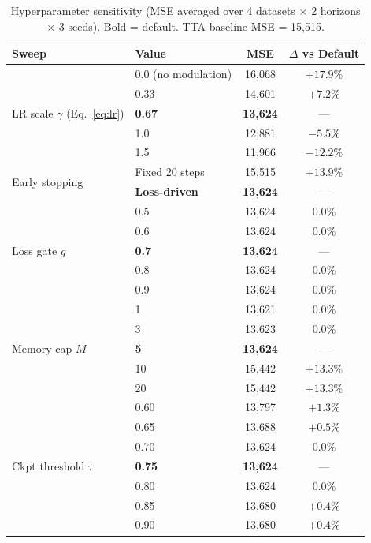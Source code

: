\documentclass[11pt,a4paper]{article}
\begin{document}
\begin{table}[t]
\centering
\caption{Hyperparameter sensitivity (MSE averaged over 4 datasets $\times$ 2 horizons $\times$ 3 seeds). Bold = default. TTA baseline MSE = 15{,}515.}
\label{tab:ablation_main}
\small
\begin{tabular}{llcc}
\toprule
Sweep & Value & MSE & $\Delta$ vs Default \\
\midrule
\multirow{5}{*}{LR scale $\gamma$ (Eq.~\ref{eq:lr})}
  & 0.0 (no modulation) & 16{,}068 & $+17.9\%$ \\
  & 0.33 & 14{,}601 & $+7.2\%$ \\
  & \textbf{0.67} & \textbf{13{,}624} & --- \\
  & 1.0 & 12{,}881 & $-5.5\%$ \\
  & 1.5 & 11{,}966 & $-12.2\%$ \\
\midrule
\multirow{2}{*}{Early stopping}
  & Fixed 20 steps & 15{,}515 & $+13.9\%$ \\
  & \textbf{Loss-driven} & \textbf{13{,}624} & --- \\
\midrule
\multirow{5}{*}{Loss gate $g$}
  & 0.5 & 13{,}624 & $0.0\%$ \\
  & 0.6 & 13{,}624 & $0.0\%$ \\
  & \textbf{0.7} & \textbf{13{,}624} & --- \\
  & 0.8 & 13{,}624 & $0.0\%$ \\
  & 0.9 & 13{,}624 & $0.0\%$ \\
\midrule
\multirow{5}{*}{Memory cap $M$}
  & 1 & 13{,}621 & $0.0\%$ \\
  & 3 & 13{,}623 & $0.0\%$ \\
  & \textbf{5} & \textbf{13{,}624} & --- \\
  & 10 & 15{,}442 & $+13.3\%$ \\
  & 20 & 15{,}442 & $+13.3\%$ \\
\midrule
\multirow{7}{*}{Ckpt threshold $\tau$}
  & 0.60 & 13{,}797 & $+1.3\%$ \\
  & 0.65 & 13{,}688 & $+0.5\%$ \\
  & 0.70 & 13{,}624 & $0.0\%$ \\
  & \textbf{0.75} & \textbf{13{,}624} & --- \\
  & 0.80 & 13{,}624 & $0.0\%$ \\
  & 0.85 & 13{,}680 & $+0.4\%$ \\
  & 0.90 & 13{,}680 & $+0.4\%$ \\
\bottomrule
\end{tabular}
\end{table}
\end{document}
